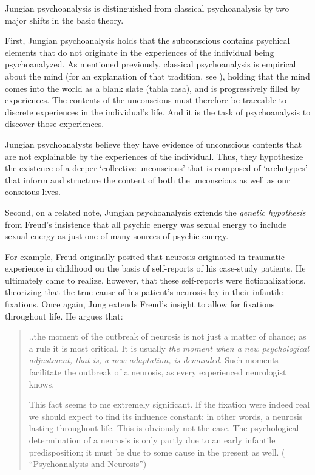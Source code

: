 \begin{refsection}
Jungian psychoanalysis is distinguished from classical psychoanalysis by two major shifts in the basic theory.

First, Jungian psychoanalysis holds that the subconscious contains psychical elements that do not originate in the experiences of the individual being psychoanalyzed. As mentioned previously, classical psychoanalysis is empirical about the mind (for an explanation of that tradition, see ), holding that the mind comes into the world as a blank slate (tabla rasa), and is progressively filled by experiences. The contents of the unconscious must therefore be traceable to discrete experiences in the individual's life. And it is the task of psychoanalysis to discover those experiences. 

Jungian psychoanalysts believe they have evidence of unconscious contents that are not explainable by the experiences of the individual. Thus, they hypothesize the existence of a deeper `collective unconscious' that is composed of `archetypes' that inform and structure the content of both the unconscious as well as our conscious lives.

Second, on a related note, Jungian psychoanalysis extends the \emph{genetic hypothesis} from Freud's insistence that all psychic energy was sexual energy to include sexual energy as just one of many sources of psychic energy.

For example, Freud originally posited that neurosis originated in traumatic experience in childhood on the basis of self-reports of his case-study patients. He ultimately came to realize, however, that these self-reports were fictionalizations, theorizing that the true cause of his patient's neurosis lay in their infantile fixations. Once again, Jung extends Freud's insight to allow for fixations throughout life. He argues that:

\begin{quote}

..the moment of the outbreak of neurosis is not just a matter of chance; as a rule it is most critical. It is usually \emph{the moment when a new psychological adjustment, that is, a new adaptation, is demanded}. Such moments facilitate the outbreak of a neurosis, as every experienced neurologist knows.

This fact seems to me extremely significant. If the fixation were indeed real we should expect to find its influence constant: in other words, a neurosis lasting throughout life. This is obviously not the case. The psychological determination of a neurosis is only partly due to an early infantile predisposition; it must be due to some cause in the present as well. (~\citep[p. 49]{Jung:ss-xAx6i} “Psychoanalysis and Neurosis”)
\end{quote}


\end{refsection}
